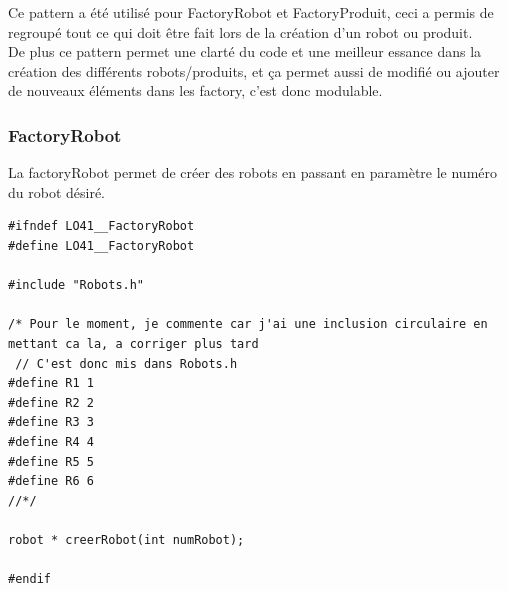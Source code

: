 \documentclass{report}
\begin{document}
Ce pattern a été utilisé pour FactoryRobot et FactoryProduit, ceci a permis de regroupé tout ce qui doit être fait lors de la création d'un robot ou produit.\\
De plus ce pattern permet une clarté du code et une meilleur essance dans la création des différents robots/produits, et ça permet aussi de modifié ou ajouter de nouveaux éléments dans les factory, c'est donc modulable.
\subsubsection{FactoryRobot}
La factoryRobot permet de créer des robots en passant en paramètre le numéro du robot désiré.
\begin{lstlisting}[caption=Factory des robots]
#ifndef LO41__FactoryRobot
#define LO41__FactoryRobot

#include "Robots.h"

/* Pour le moment, je commente car j'ai une inclusion circulaire en mettant ca la, a corriger plus tard
 // C'est donc mis dans Robots.h
#define R1 1
#define R2 2
#define R3 3
#define R4 4
#define R5 5
#define R6 6
//*/

robot * creerRobot(int numRobot);

#endif
\end{lstlisting}
\end{document}
